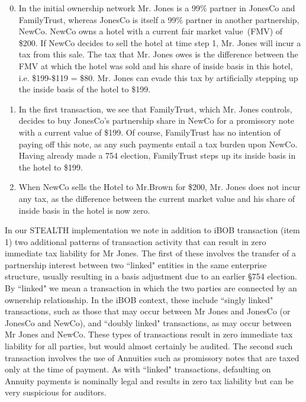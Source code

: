 {\small
\begin{enumerate}
\setcounter{enumi}{-1}
\item In the initial ownership network Mr. Jones is a 99\% partner in
  JonesCo and FamilyTrust, whereas JonesCo is itself a 99\% partner in
  another partnership, NewCo. NewCo owns a hotel with a current fair
  market value~(FMV) of \$200. If NewCo decides to sell the hotel at
  time step 1, Mr. Jones will incur a tax from this sale. The tax that
  Mr. Jones owes is the difference between the FMV at which the hotel
  was sold and his share of inside basis in this hotel,
  i.e. \$199-\$119 = \$80.  Mr. Jones can evade this tax by
  artificially stepping up the inside basis of the hotel to \$199.

\item In the first transaction, we see that FamilyTrust, which
  Mr. Jones controls, decides to buy JonesCo's partnership share in
  NewCo for a promissory note with a current value of \$199.  Of
  course, FamilyTrust has no intention of paying off this note, as any
  such payments entail a tax burden upon NewCo. Having already made a
  754 election, FamilyTrust steps up its inside basis in the hotel to
  \$199.

\item When NewCo sells the Hotel to Mr.Brown for \$200, Mr. Jones does
  not incur any tax, as the difference between the current market
  value and his share of inside basis in the hotel is now zero.
\end{enumerate}
}

In our STEALTH implementation we note in addition to iBOB transaction
(item 1) two additional patterns of transaction activity that can
result in zero immediate tax liability for Mr Jones.  The first of
these involves the transfer of a partnership interest between two
``linked" entities in the same enterprise structure, usually resulting
in a basis adjustment due to an earlier \S 754 election. By ``linked"
we mean a transaction in which the two parties are connected by an
ownership relationship.  In the iBOB context, these include ``singly
linked" transactions, such as those that may occur between Mr Jones
and JonesCo (or JonesCo and NewCo), and ``doubly linked" transactions,
as may occur between Mr Jones and NewCo.  These types of transactions
result in zero immediate tax liability for all parties, but would
almost certainly be audited.  The second such transaction involves the
use of Annuities such as promissory notes that are taxed only at the
time of payment.  As with ``linked" transactions, defaulting on
Annuity payments is nominally legal and results in zero tax liability
but can be very suspicious for auditors.

